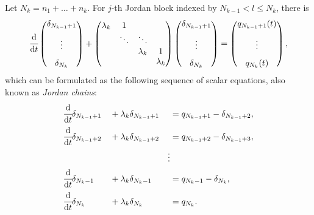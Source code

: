 \documentclass[accepted]{uai2023}
\newcommand{\dt}[1]{\cfrac{\mathrm{d} #1}{\mathrm{d} t}}
\begin{document}
    Let $N_k = n_1+\dots + n_k$. For $j$-th Jordan block indexed by $N_{k-1} < l \leq N_k$, there is
    \begin{equation}
        \dt{}
        \begin{pmatrix}
            \delta_{N_{k-1} + 1} \\[0.8em] \vdots \\[0.8em] \delta_{N_k}
        \end{pmatrix} 
        + 
        \begin{pmatrix}
            \lambda_k & 1 \\
            & \ddots & \ddots \\
            & & \lambda_k & 1\\
            & & & \lambda_k \\
        \end{pmatrix}
        \begin{pmatrix}
            \delta_{N_{k-1} + 1} \\[0.8em] \vdots \\[0.8em] \delta_{N_k}
        \end{pmatrix} 
        =
        \begin{pmatrix}
            q_{N_{k-1} + 1}(t) \\[0.8em] \vdots \\[0.8em] q_{N_k}(t)
        \end{pmatrix},
    \end{equation}
    which can be formulated as the following sequence of scalar equations, also known as \textit{Jordan chains}:
    \begin{alignat}{4}
        &\dt{}\delta_{N_{k-1} + 1} &&+\lambda_k\delta_{N_{k-1} + 1} &&= q_{N_{k-1}+1} - \delta_{N_{k-1}+2}, \label{eq:jordan-chain-first}\\
        &\dt{}\delta_{N_{k-1} + 2} &&+\lambda_k\delta_{N_{k-1} + 2} &&= q_{N_{k-1}+2} - \delta_{N_{k-1}+3}, \label{eq:jordan-chain-second}\\
        &&&& \vdots \nonumber\\
        &\dt{}\delta_{N_k-1} &&+\lambda_k\delta_{N_k-1} &&= q_{N_k-1} - \delta_{N_k}, \label{eq:jordan-chain-second2last}\\
        &\dt{}\delta_{N_k} && + \lambda_k\delta_{N_k} & &= q_{N_k}. \label{eq:jordan-chain-last}
    \end{alignat}
\end{document}
